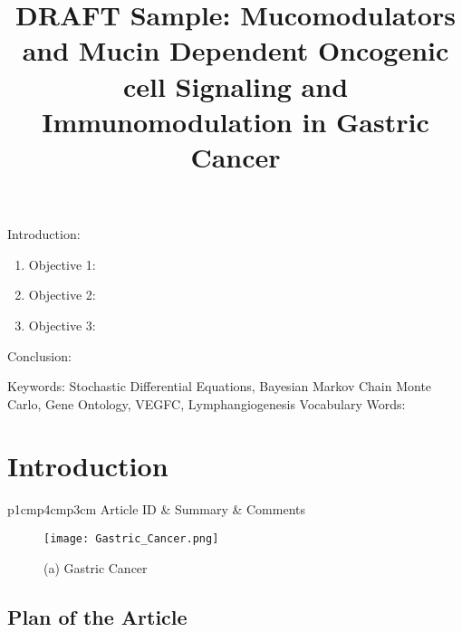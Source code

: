 

\twocolumn
\scriptsize
\begin{frontmatter}
		\title{DRAFT Sample: Mucomodulators and Mucin Dependent Oncogenic cell Signaling and Immunomodulation in Gastric Cancer}
		\author{}
		\address{The Mathematical Learning Space}
\end{frontmatter}	

Introduction:
\begin{enumerate}
\item Objective 1:
\item Objective 2:
\item Objective 3:
\end{enumerate}
Conclusion:

Keywords: Stochastic Differential Equations, Bayesian Markov Chain Monte Carlo, Gene Ontology, VEGFC, Lymphangiogenesis
Vocabulary Words:

\section{Introduction}

\begin{table}[H]\centering
	\begin{tabular}{p{1cm}p{4cm}p{3cm}}
		Article ID & Summary & Comments\\
		\hline
		\hline
	\end{tabular}
\end{table}

\begin{figure}[H]
\begin{minipage}[b]{0.3\linewidth}
\texttt{[image: Gastric\_Cancer.png]} 
\end{minipage}\hfill
\caption{(a) Gastric Cancer}
\label{fig:Figure1}
\end{figure} 

\subsection{Plan of the Article}

\begin{enumerate}
\end{enumerate}

